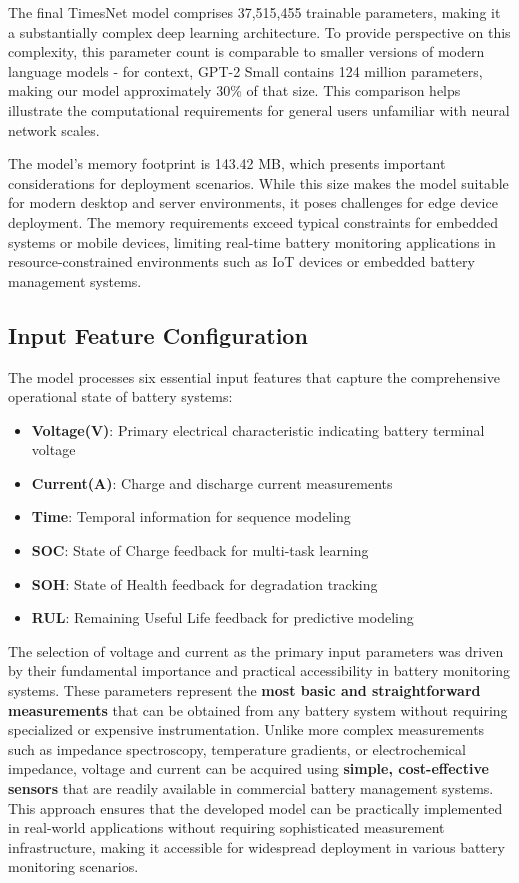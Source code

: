The final TimesNet model comprises 37,515,455 trainable parameters, making it a substantially complex deep learning architecture. To provide perspective on this complexity, this parameter count is comparable to smaller versions of modern language models - for context, GPT-2 Small contains 124 million parameters, making our model approximately 30\% of that size. This comparison helps illustrate the computational requirements for general users unfamiliar with neural network scales.

The model's memory footprint is 143.42 MB, which presents important considerations for deployment scenarios. While this size makes the model suitable for modern desktop and server environments, it poses challenges for edge device deployment. The memory requirements exceed typical constraints for embedded systems or mobile devices, limiting real-time battery monitoring applications in resource-constrained environments such as IoT devices or embedded battery management systems.

\subsection{Input Feature Configuration}
\label{subsec:input_features}

The model processes six essential input features that capture the comprehensive operational state of battery systems:

\begin{itemize}
    \item \textbf{Voltage(V)}: Primary electrical characteristic indicating battery terminal voltage
    \item \textbf{Current(A)}: Charge and discharge current measurements
    \item \textbf{Time}: Temporal information for sequence modeling
    \item \textbf{SOC}: State of Charge feedback for multi-task learning
    \item \textbf{SOH}: State of Health feedback for degradation tracking
    \item \textbf{RUL}: Remaining Useful Life feedback for predictive modeling
\end{itemize}

The selection of voltage and current as the primary input parameters was driven by their fundamental importance and practical accessibility in battery monitoring systems. These parameters represent the \textbf{most basic and straightforward measurements} that can be obtained from any battery system without requiring specialized or expensive instrumentation. Unlike more complex measurements such as impedance spectroscopy, temperature gradients, or electrochemical impedance, voltage and current can be acquired using \textbf{simple, cost-effective sensors} that are readily available in commercial battery management systems. This approach ensures that the developed model can be practically implemented in real-world applications without requiring sophisticated measurement infrastructure, making it accessible for widespread deployment in various battery monitoring scenarios.

